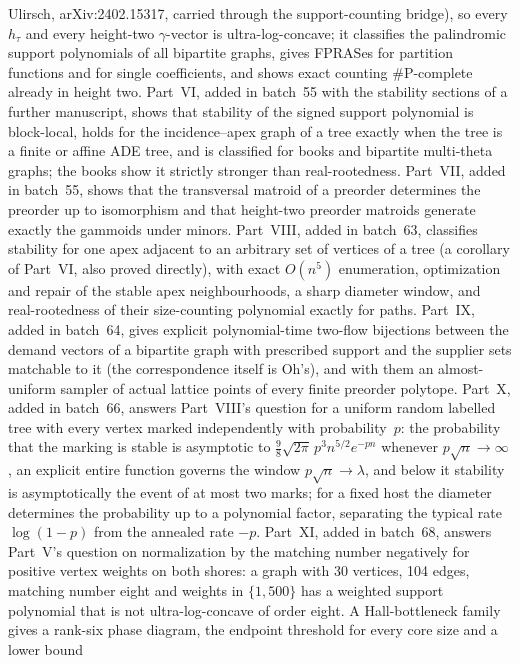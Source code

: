 \documentclass[11pt]{article}
\begin{document}
{Ulirsch, arXiv:2402.15317, carried through the support-counting bridge), so
every $h_\tau$ and every height-two $\gamma$-vector is ultra-log-concave; it
classifies the palindromic support polynomials of all bipartite graphs, gives
FPRASes for partition functions and for single coefficients, and shows exact
counting \#P-complete already in height two.  Part~VI, added in batch~55 with
the stability sections of a further manuscript, shows that stability of the
signed support polynomial is block-local, holds for the incidence--apex graph
of a tree exactly when the tree is a finite or affine ADE tree, and is
classified for books and bipartite multi-theta graphs; the books show it
strictly stronger than real-rootedness.  Part~VII, added in batch~55, shows
that the transversal matroid of a preorder determines the preorder up to
isomorphism and that height-two preorder matroids generate exactly the
gammoids under minors.  Part~VIII, added in batch~63, classifies stability
for one apex adjacent to an arbitrary set of vertices of a tree (a corollary
of Part~VI, also proved directly), with exact $O(n^5)$ enumeration,
optimization and repair of the stable apex neighbourhoods, a sharp diameter
window, and real-rootedness of their size-counting polynomial exactly for
paths.  Part~IX, added in batch~64, gives explicit polynomial-time two-flow
bijections between the demand vectors of a bipartite graph with prescribed
support and the supplier sets matchable to it (the correspondence itself is
Oh's), and with them an almost-uniform sampler of actual lattice points of
every finite preorder polytope.  Part~X, added in batch~66, answers
Part~VIII's question for a uniform random labelled tree with every vertex
marked independently with probability~$p$: the probability that the marking
is stable is asymptotic to $\frac98\sqrt{2\pi}\,p^3n^{5/2}e^{-pn}$ whenever
$p\sqrt n\to\infty$, an explicit entire function governs the window
$p\sqrt n\to\lambda$, and below it stability is asymptotically the event of
at most two marks; for a fixed host the diameter determines the probability
up to a polynomial factor, separating the typical rate $\log(1-p)$ from the
annealed rate $-p$.  Part~XI, added in batch~68, answers Part~V's question on
normalization by the matching number negatively for positive vertex weights
on both shores: a graph with 30 vertices, 104 edges, matching number eight
and weights in $\{1,500\}$ has a weighted support polynomial that is not
ultra-log-concave of order eight.  A Hall-bottleneck family gives a rank-six
phase diagram, the endpoint threshold for every core size and a lower bound
}
\end{document}
